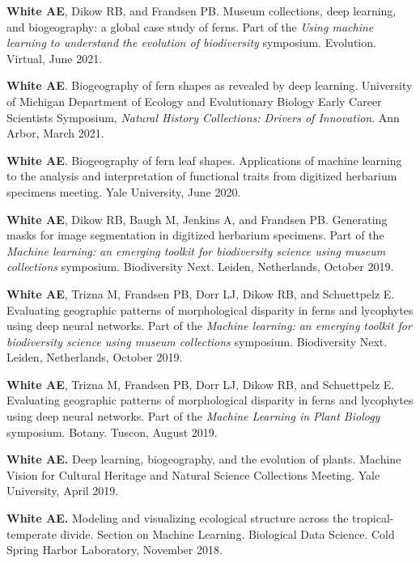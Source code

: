 \documentclass[letterpaper]{article}
\newenvironment{biblist}{%
   \begin{list}{}{%
     \setlength{\labelwidth}{0pt}%
     \setlength{\labelsep}{1em}%
     \setlength{\leftmargin}{2em}%
     \setlength{\itemindent}{-1em}%
   }
}{\end{list}}
\begin{document}
\begin{biblist}
\item \textbf{White AE}, Dikow RB, and Frandsen PB. Museum collections, deep learning, and biogeography: a global case study of ferns. Part of the \textit{Using machine learning to understand the evolution of biodiversity} symposium. Evolution. Virtual, June 2021.

\item \textbf{White AE}. Biogeography of fern shapes as revealed by deep learning. University of Michigan Department of Ecology and Evolutionary Biology Early Career Scientists Symposium, \textit{Natural History Collections: Drivers of Innovation}. Ann Arbor, March 2021.

\item \textbf{White AE}. Biogeography of fern leaf shapes. Applications of machine learning to the analysis and interpretation of functional traits from digitized herbarium specimens meeting. Yale University, June 2020.

\item \textbf{White AE}, Dikow RB, Baugh M, Jenkins A, and Frandsen PB. Generating masks for image segmentation in digitized herbarium specimens. Part of the \textit{Machine learning: an emerging toolkit for biodiversity science using museum collections} symposium. Biodiversity Next. Leiden, Netherlands, October 2019.

\item \textbf{White AE}, Trizna M, Frandsen PB, Dorr LJ, Dikow RB, and Schuettpelz E. Evaluating geographic patterns of morphological disparity in ferns and lycophytes using deep neural networks. Part of the \textit{Machine learning: an emerging toolkit for biodiversity science using museum collections} symposium. Biodiversity Next. Leiden, Netherlands, October 2019.

\item \textbf{White AE}, Trizna M, Frandsen PB, Dorr LJ, Dikow RB, and Schuettpelz E. Evaluating geographic patterns of morphological disparity in ferns and lycophytes using deep neural networks. Part of the \textit{Machine Learning in Plant Biology} symposium. Botany. Tuscon, August 2019.

\item \textbf{White AE.} Deep learning, biogeography, and the evolution of plants. Machine Vision for Cultural Heritage and Natural Science Collections Meeting. Yale University, April 2019.

\item \textbf{White AE.} Modeling and visualizing ecological structure across the tropical- temperate divide. Section on Machine Learning. Biological Data Science. Cold Spring Harbor Laboratory, November 2018.
\end{biblist}
\end{document}
